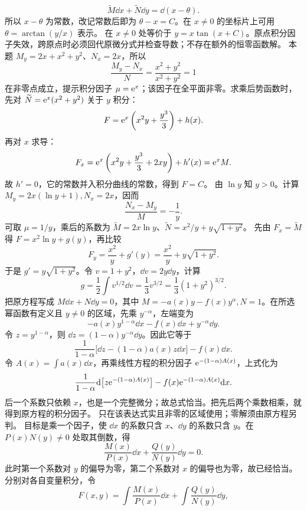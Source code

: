 \[
\widetilde M\dd x+\widetilde N\dd y=\dd(x-\theta).
\]
所以 $x-\theta$ 为常数，改记常数后即为 $\theta-x=C$。在 $x\ne0$ 的坐标片上可用 $\theta=\arctan(y/x)$ 表示。
在 $x\ne0$ 处等价于 $y=x\tan(x+C)$。原点积分因子失效，跨原点时必须回代原微分式并检查导数；不存在额外的恒零函数解。
本题 $M_y=2x+x^2+y^2$、$N_x=2x$，所以
\[
\dfrac{M_y-N_x}{N}=\dfrac{x^2+y^2}{x^2+y^2}=1
\]
在非零点成立，提示积分因子 $\mu=\mathrm e^x$；该因子在全平面非零。求乘后势函数时，先对 $\widetilde N=\mathrm e^x(x^2+y^2)$ 关于 $y$ 积分：
\[
F=\mathrm e^x\left(x^2y+\dfrac{y^3}{3}\right)+h(x).
\]
再对 $x$ 求导：
\[
F_x=\mathrm e^x\left(x^2y+\dfrac{y^3}{3}+2xy\right)+h'(x)=\mathrm e^xM.
\]
故 $h'=0$，它的常数并入积分曲线的常数，得到 $F=C$。
由 $\ln y$ 知 $y>0$。计算 $M_y=2x(\ln y+1),N_x=2x$，因而
\[
\dfrac{N_x-M_y}{M}=-\dfrac1y.
\]
可取 $\mu=1/y$，乘后的系数为 $\widetilde M=2x\ln y$、$\widetilde N=x^2/y+y\sqrt{1+y^2}$。
先由 $F_x=\widetilde M$ 得 $F=x^2\ln y+g(y)$，再比较
\[
F_y=\dfrac{x^2}{y}+g'(y)=\dfrac{x^2}{y}+y\sqrt{1+y^2}.
\]
于是 $g'=y\sqrt{1+y^2}$。令 $v=1+y^2$，$\dd v=2y\dd y$，计算
\[
g=\dfrac12\int v^{1/2}\dd v=\dfrac13v^{3/2}=\dfrac13(1+y^2)^{3/2}.
\]
把原方程写成 $M\dd x+N\dd y=0$，其中 $M=-a(x)y-f(x)y^\alpha,N=1$。在所选幂函数有定义且 $y\ne0$ 的区域，先乘 $y^{-\alpha}$，左端变为
\[
-a(x)y^{1-\alpha}\dd x-f(x)\dd x+y^{-\alpha}\dd y.
\]
令 $z=y^{1-\alpha}$，则 $\dd z=(1-\alpha)y^{-\alpha}\dd y$。因此它等于
\[
\dfrac1{1-\alpha}\bigl[\dd z-(1-\alpha)a(x)z\dd x\bigr]-f(x)\dd x.
\]
令 $\displaystyle A(x)=\int a(x)\dd x$，再乘线性方程的积分因子 $\mathrm e^{-(1-\alpha)A(x)}$，上式化为
\[
\dfrac1{1-\alpha}\mathrm d\bigl[z\mathrm e^{-(1-\alpha)A(x)}\bigr]
-f(x)\mathrm e^{-(1-\alpha)A(x)}\mathrm d x.
\]
后一个系数只依赖 $x$，也是一个完整微分；故总式恰当。把先后两个乘数相乘，就得到原方程的积分因子。
只在该表达式实且非零的区域使用；零解须由原方程另判。
目标是乘一个因子，使 $\dd x$ 的系数只含 $x$、$\dd y$ 的系数只含 $y$。在 $P(x)N(y)\ne0$ 处取其倒数，得
\[
\dfrac{M(x)}{P(x)}\dd x+\dfrac{Q(y)}{N(y)}\dd y=0.
\]
此时第一个系数对 $y$ 的偏导为零，第二个系数对 $x$ 的偏导也为零，故已经恰当。分别对各自变量积分，令
\[
F(x,y)=\int\dfrac{M(x)}{P(x)}\dd x+\int\dfrac{Q(y)}{N(y)}\dd y,
\]
